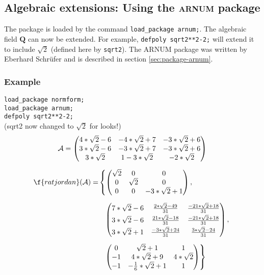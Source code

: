 \subsection{Algebraic extensions: Using the \textsc{arnum} package}
\label{sec:normform-arnum}

The package is loaded by the command \texttt{load\_package arnum;}. The algebraic 
field $\mathbf{Q}$ can now be extended. For example, 
\texttt{defpoly sqrt2**2-2;} will extend it to include ${\sqrt{2}}$ (defined here by 
\texttt{sqrt2}). The {\small ARNUM} package was written by Eberhard 
Schr\"ufer and is described in section \ref{sec:package-arnum}.

\subsubsection{Example}

\texttt{load\_package normform;} \\
\texttt{load\_package arnum;} \\
\texttt{defpoly sqrt2**2-2;} \\
(sqrt2 now changed to ${\sqrt{2}}$ for looks!) 
\begin{gather*}
\mathcal{A} = \begin{pmatrix} 4*{\sqrt{2}}-6 & -4*{\sqrt{2}}+7 &
-3*{\sqrt{2}}+6 \\ 3*{\sqrt{2}}-6 & -3*{\sqrt{2}}+7 & -3*{\sqrt{2}}+6 
\\ 3*{\sqrt{2}} & 1-3*{\sqrt{2}} & -2*{\sqrt{2}}   \end{pmatrix} \\[2mm]
%
\begin{split}
\f{ratjordan}(\mathcal{A})  = & 
\left\{ \begin{pmatrix} {\sqrt{2}} & 0 & 0 \\ 0 & {\sqrt{2}} 
& 0 \\ 0 & 0 & -3*{\sqrt{2}}+1 \end{pmatrix}, \right. \\[2mm]
 & \hspace{0.1in} \left. \begin{pmatrix}
 7*{\sqrt{2}}-6 & \frac{2*{\sqrt{2}}-49}{31} & \frac{-21*{\sqrt{2}}+18}{31} \\[1mm] 
 3*{\sqrt{2}}-6 & \frac{21*{\sqrt{2}}-18}{31} & \frac{-21*{\sqrt{2}}+18}{31} \\[1mm]
 3*{\sqrt{2}}+1 & \frac{-3*{\sqrt{2}}+24}{31} & \frac{3*{\sqrt{2}}-24}{31}
 \end{pmatrix}, \right. \\[2mm]
& \hspace{0.1in} \left. \begin{pmatrix} 0 & {\sqrt{2}}+1 & 
1 \\ -1 & 4*{\sqrt{2}}+9 & 4*{\sqrt{2}} \\ -1 & -\frac{1}{6}*{\sqrt{2}}
+1 & 1 \end{pmatrix} \right\} 
\end{split}
\end{gather*}

